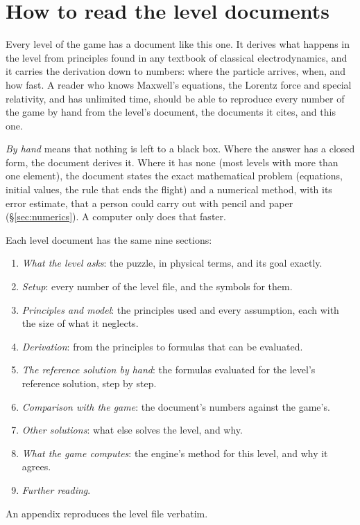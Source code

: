 \documentclass{leveldoc}
\begin{document}
\tableofcontents

\section{How to read the level documents}\label{sec:reading}

Every level of the game has a document like this one. It derives what happens in the level
from principles found in any textbook of classical electrodynamics, and it carries the
derivation down to numbers: where the particle arrives, when, and how fast. A reader who
knows Maxwell's equations, the Lorentz force and special relativity, and has unlimited time,
should be able to reproduce every number of the game by hand from the level's document, the
documents it cites, and this one.

\emph{By hand} means that nothing is left to a black box. Where the answer has a closed form,
the document derives it. Where it has none (most levels with more than one element), the
document states the exact mathematical problem (equations, initial values, the rule that
ends the flight) and a numerical method, with its error estimate, that a person could carry
out with pencil and paper (§\ref{sec:numerics}). A computer only does that faster.

Each level document has the same nine sections:
\begin{enumerate}[label=\arabic*.]
  \item \emph{What the level asks}: the puzzle, in physical terms, and its goal exactly.
  \item \emph{Setup}: every number of the level file, and the symbols for them.
  \item \emph{Principles and model}: the principles used and every assumption, each with the
    size of what it neglects.
  \item \emph{Derivation}: from the principles to formulas that can be evaluated.
  \item \emph{The reference solution by hand}: the formulas evaluated for the level's
    reference solution, step by step.
  \item \emph{Comparison with the game}: the document's numbers against the game's.
  \item \emph{Other solutions}: what else solves the level, and why.
  \item \emph{What the game computes}: the engine's method for this level, and why it agrees.
  \item \emph{Further reading}.
\end{enumerate}
An appendix reproduces the level file verbatim.
\end{document}
